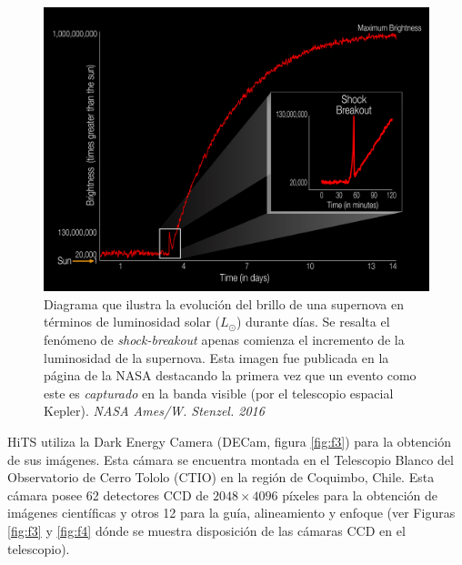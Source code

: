 

\begin{figure}[h!]
\centering
\includegraphics[scale=.25]{images/breakout}
\caption{Diagrama que ilustra la evoluci\'on del brillo de una supernova en t\'erminos de luminosidad solar ($L_{\odot}$) durante d\'ias. Se resalta el fen\'omeno de \textit{shock-breakout} apenas comienza el incremento de la luminosidad de la supernova. Esta imagen fue publicada en la p\'agina de la NASA destacando la primera vez que un evento como este es \textit{capturado} en la banda visible (por el telescopio espacial Kepler). \textit{NASA Ames/W. Stenzel. 2016}}
\label{fig:f2}
\end{figure}

HiTS utiliza la Dark Energy Camera (DECam, figura \ref{fig:f3}) para la obtenci\'on de sus im\'agenes. Esta c\'amara se encuentra montada en el Telescopio Blanco del Observatorio de Cerro Tololo (CTIO) en la regi\'on de Coquimbo, Chile. Esta c\'amara posee 62 detectores CCD de $2048 \times 4096$ p\'ixeles para la obtenci\'on de im\'agenes cient\'ificas y otros 12 para la gu\'ia, alineamiento y enfoque (ver Figuras \ref{fig:f3} y \ref{fig:f4} d\'onde se muestra disposici\'on de las c\'amaras CCD en el telescopio). 
\bigskip

